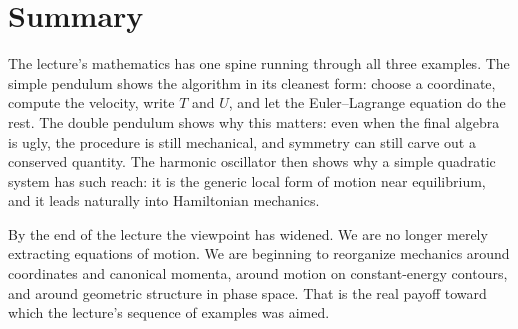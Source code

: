 \section{Summary}

The lecture's mathematics has one spine running through all three examples. The simple pendulum shows the algorithm in its cleanest form: choose a coordinate, compute the velocity, write \(T\) and \(U\), and let the Euler--Lagrange equation do the rest. The double pendulum shows why this matters: even when the final algebra is ugly, the procedure is still mechanical, and symmetry can still carve out a conserved quantity. The harmonic oscillator then shows why a simple quadratic system has such reach: it is the generic local form of motion near equilibrium, and it leads naturally into Hamiltonian mechanics.

By the end of the lecture the viewpoint has widened. We are no longer merely extracting equations of motion. We are beginning to reorganize mechanics around coordinates and canonical momenta, around motion on constant-energy contours, and around geometric structure in phase space. That is the real payoff toward which the lecture's sequence of examples was aimed.